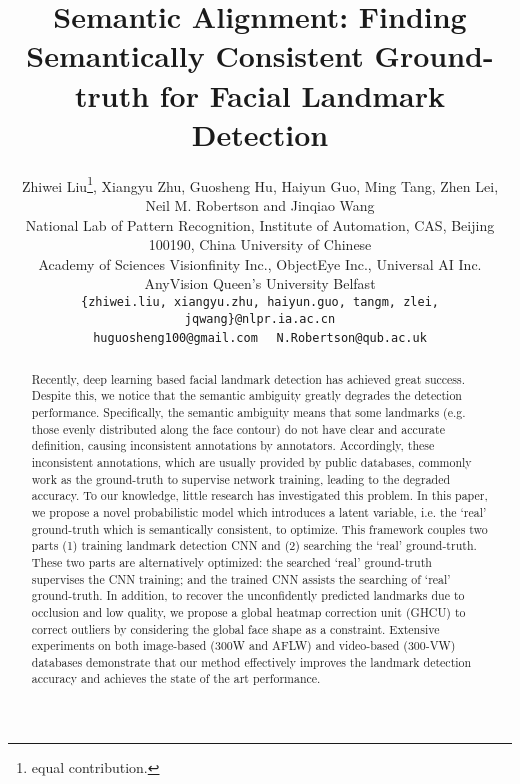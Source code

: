 \documentclass[10pt,twocolumn,letterpaper]{article}
\begin{document}
\title{Semantic Alignment: Finding {Semantically} Consistent {Ground-truth} for Facial Landmark Detection}

\author{\normalsize{Zhiwei Liu}\thanks{equal contribution.}, \normalsize{Xiangyu Zhu}, 
	\normalsize{Guosheng Hu}, \normalsize{Haiyun Guo}, 
	\normalsize{Ming Tang}, \normalsize{Zhen Lei}, 
	\normalsize{Neil M. Robertson and Jinqiao Wang}\\
	\small{National Lab of Pattern Recognition, Institute of Automation, CAS, Beijing 100190, China} 
	\small{University of Chinese} \\ \small{Academy of Sciences}  
	\small{Visionfinity Inc., ObjectEye Inc., Universal AI Inc.}
	\small{AnyVision} 
	\small{Queen’s University Belfast}\\
	{\small \tt {\{zhiwei.liu, xiangyu.zhu, haiyun.guo, tangm, zlei, jqwang\}}@nlpr.ia.ac.cn} \\  
	{\small \tt {huguosheng100@gmail.com}}  \ \ {\small\tt {N.Robertson@qub.ac.uk}}
}
\maketitle


\begin{abstract}
	Recently, deep learning based facial landmark detection has achieved great success. Despite this, we notice that 
	the semantic ambiguity greatly degrades the detection performance. Specifically, the semantic ambiguity means 
	that some landmarks (e.g. those evenly distributed along the face contour) do not have clear and accurate definition, 
	causing inconsistent annotations by annotators. Accordingly, 
	these inconsistent annotations, which are usually provided by public databases, commonly work as the  
	ground-truth to supervise network training, leading to the degraded accuracy.
	To our knowledge, little research has investigated this problem. 
	In this paper, we propose a novel probabilistic model which introduces a latent variable, i.e. the `real' ground-truth which 
	is semantically consistent, to optimize. This framework couples two parts (1) training landmark detection CNN and (2) 
	searching the `real' ground-truth. These two parts are alternatively optimized: the searched `real' ground-truth 
	supervises the CNN training; and the trained CNN assists the searching of `real' ground-truth. 
	In addition, to recover the unconfidently predicted landmarks due to occlusion and low quality, 
	we propose a global heatmap correction unit (GHCU) to correct outliers by considering the global face shape as a constraint. 
	Extensive experiments on both image-based (300W and AFLW) and video-based (300-VW) databases demonstrate that our 
	method effectively improves the landmark detection accuracy and achieves the state of the art performance.
\end{abstract}
\end{document}
